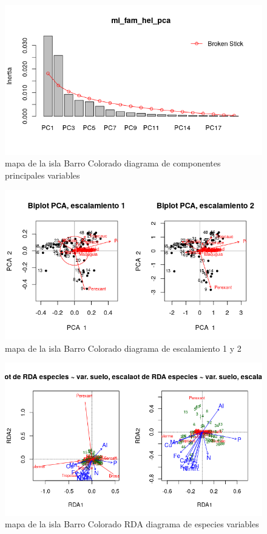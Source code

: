 \documentclass[11pt,]{article}
\begin{document}
\begin{figure}
\centering
\includegraphics[width=1.00000\textwidth]{mi_fam_hel_pca.png}
\caption{mapa de la isla Barro Colorado diagrama de componentes
principales variables\label{fig:bci_map}}
\end{figure}

\begin{figure}
\centering
\includegraphics[width=1.00000\textwidth]{escalamiento_1_2.png}
\caption{mapa de la isla Barro Colorado diagrama de escalamiento 1 y 2
\label{fig:bci_map}}
\end{figure}

\begin{figure}
\centering
\includegraphics[width=1.00000\textwidth]{rda_escala_especies.png}
\caption{mapa de la isla Barro Colorado RDA diagrama de especies
variables\label{fig:bci_map}}
\end{figure}
\end{document}
